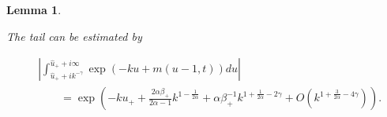 \documentclass[12pt,twoside]{article}
\theoremstyle{plain}
\theoremstyle{plain}
\newtheorem{lemma}[proposition]{Lemma}
\theoremstyle{definition}
\theoremstyle{remark}
\numberwithin{equation}{section}
\begin{document}
\begin{lemma}
\label{eq: tail estimate}

The tail can be estimated by

\begin{equation}
\begin{aligned}
&\left|\int_{\hat u_+ +i k^{-\gamma}} ^{\hat u_+ + i \infty} \exp(-ku + m(u-1,t))du\right|\\[5pt]
&\qquad=\exp\left(-ku_+ + \frac{2\alpha\beta_+}{2\alpha-1} k^{1-\frac{1}{2\alpha}} + \alpha\beta_+^{-1}k^{1+\frac{1}{2\alpha} -2\gamma} + O(k^{1+\frac{3}{2\alpha} - 4\gamma}) \right).
\end{aligned}
\end{equation}

\end{lemma}
\end{document}
